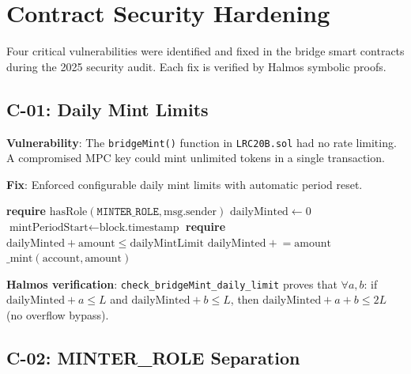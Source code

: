 \section{Contract Security Hardening}
\label{sec:contract-security}

Four critical vulnerabilities were identified and fixed in the bridge smart contracts during the 2025 security audit. Each fix is verified by Halmos symbolic proofs.

\subsection{C-01: Daily Mint Limits}

\textbf{Vulnerability}: The \texttt{bridgeMint()} function in \texttt{LRC20B.sol} had no rate limiting. A compromised MPC key could mint unlimited tokens in a single transaction.

\textbf{Fix}: Enforced configurable daily mint limits with automatic period reset.

\begin{algorithm}[H]
\caption{C-01: Rate-Limited Bridge Mint}
\begin{algorithmic}[1]
    \State \textbf{require} $\text{hasRole}(\texttt{MINTER\_ROLE}, \text{msg.sender})$ 
        \State $\text{dailyMinted} \gets 0$
        \State $\text{mintPeriodStart} \gets \text{block.timestamp}$
    \EndIf
        \State \textbf{require} $\text{dailyMinted} + \text{amount} \leq \text{dailyMintLimit}$ 
        \State $\text{dailyMinted} \mathrel{+}= \text{amount}$
    \EndIf
    \State $\text{\_mint}(\text{account}, \text{amount})$
\EndFunction
\end{algorithmic}
\end{algorithm}

\textbf{Halmos verification}: \texttt{check\_bridgeMint\_daily\_limit} proves that $\forall a, b$: if $\text{dailyMinted} + a \leq L$ and $\text{dailyMinted} + b \leq L$, then $\text{dailyMinted} + a + b \leq 2L$ (no overflow bypass).

\subsection{C-02: MINTER\_ROLE Separation}

